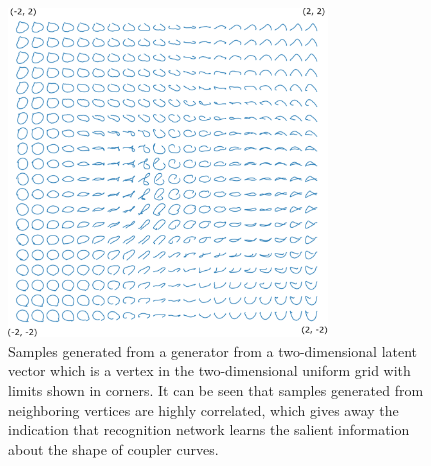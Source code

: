 \begin{figure}
\centering
\includegraphics[width=240pt]{jmd-19/figure/path_embedding_with_grid.eps}
  \caption{Samples generated from a generator from a two-dimensional latent vector which is a vertex in the two-dimensional uniform grid with limits shown in corners. It can be seen that samples generated from neighboring vertices are highly correlated, which gives away the indication that recognition network learns the salient information about the shape of coupler curves.}
\label{vae_fb_random_samples}
\end{figure}



